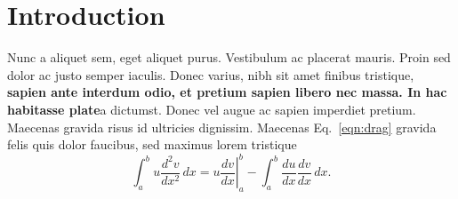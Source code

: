 \section{Introduction}
\label{intro} 
Nunc a aliquet sem, eget aliquet purus. Vestibulum ac placerat mauris. Proin sed dolor ac justo semper iaculis. Donec varius, nibh sit amet finibus tristique, \textbf{sapien ante interdum odio, et pretium sapien libero nec massa. In hac habitasse plate}a dictumst. Donec vel augue ac sapien imperdiet pretium. Maecenas gravida risus id ultricies dignissim. Maecenas Eq.~\ref{eqn:drag} gravida felis quis dolor faucibus, sed maximus lorem tristique
\begin{equation}
\label{eqn:drag}
	\int_a^bu\frac{d^2v}{dx^2}\,dx
	=\left.u\frac{dv}{dx}\right|_a^b
	-\int_a^b\frac{du}{dx}\frac{dv}{dx}\,dx.
\end{equation}
